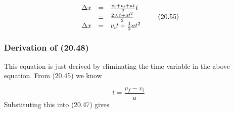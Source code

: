     \begin{equation}
    \begin{array}{ccc}\hfill \Delta x& =& \frac{{v}_{i}+{v}_{i}+at}{2}t\hfill \\ & =& \frac{2{v}_{i}t+a{t}^{2}}{2}\hfill \\ \hfill \Delta x& =& {v}_{i}t+\frac{1}{2}a{t}^{2}\hfill \end{array}\tag{20.55}
      \end{equation}
        \label{m38796*uid138}
            \subsubsection{ Derivation of (20.48)}
            \nopagebreak
          \label{m38796*id77086}This equation is just derived by eliminating the time variable in the above equation. From  (20.45) we know\par 
          \label{m38796*id77095}\nopagebreak\noindent{}
            
    \begin{equation}
    t=\frac{{v}_{f}-{v}_{i}}{a}\tag{20.56}
      \end{equation}
          \label{m38796*id77132}Substituting this into (20.47) gives\par 
          \label{m38796*uid139}\nopagebreak\noindent{}
            

